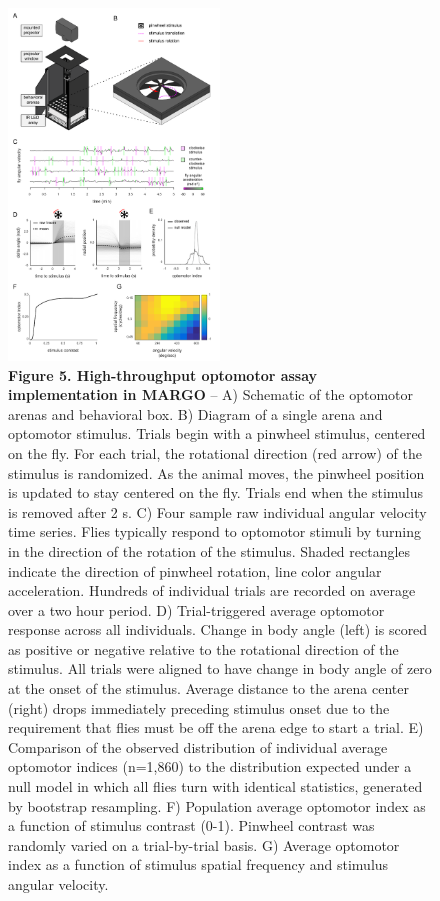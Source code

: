 \documentclass[10pt]{article}
\begin{document}
\newpage
\begin{figure}[h!]
	\begin{center}
		\includegraphics[width=0.5\textwidth]{../figures/optomotor_panel_sm.pdf}
	\end{center}
	\caption*{\footnotesize \textbf{Figure 5. High-throughput optomotor assay implementation in MARGO} -- A) Schematic of the optomotor arenas and behavioral box. B) Diagram of a single arena and optomotor stimulus. Trials begin with a pinwheel stimulus, centered on the fly. For each trial, the rotational direction (red arrow) of the stimulus is randomized. As the animal moves, the pinwheel position is updated to stay centered on the fly. Trials end when the stimulus is removed after 2 s. C) Four sample raw individual angular velocity time series. Flies typically respond to optomotor stimuli by turning in the direction of the rotation of the stimulus. Shaded rectangles indicate the direction of pinwheel rotation, line color angular acceleration. Hundreds of individual trials are recorded on average over a two hour period. D) Trial-triggered average optomotor response across all individuals. Change in body angle (left) is scored as positive or negative relative to the rotational direction of the stimulus. All trials were aligned to have change in body angle of zero at the onset of the stimulus. Average distance to the arena center (right) drops immediately preceding stimulus onset due to the requirement that flies must be off the arena edge to start a trial. E) Comparison of the observed distribution of individual average optomotor indices (n=1,860) to the distribution expected under a null model in which all flies turn with identical statistics, generated by bootstrap resampling. F) Population average optomotor index as a function of stimulus contrast (0-1). Pinwheel contrast was randomly varied on a trial-by-trial basis. G) Average optomotor index as a function of stimulus spatial frequency and stimulus angular velocity.}
\end{figure}
\end{document}
